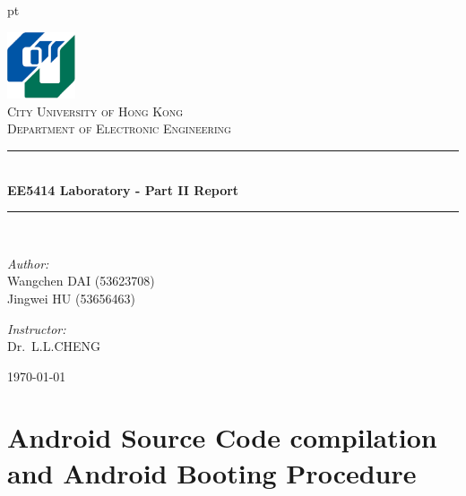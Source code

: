 \documentclass[10pt,journal,draftclsnofoot,onecolumn]{IEEEtran}
\begin{document}

 pt

\begin{titlepage}

\begin{center}


\includegraphics[width=0.15\textwidth]{./figs/logo.png}\\[1cm]    

\textsc{\LARGE City University of Hong Kong}\\[1.5cm]

\textsc{\Large Department  of Electronic Engineering}\\[0.5cm]


\rule{0.9\textwidth}{1pt}\\[0.4cm]
{ \huge \bfseries EE5414 Laboratory - Part II Report}\\[0.4cm]
\rule{0.9\textwidth}{1pt}\\[1.5cm]


\begin{minipage}[t]{0.4\textwidth}
\begin{flushleft} \large
\emph{Author:}\\
Wangchen \textsc{DAI} (53623708)\\
Jingwei \textsc{HU} (53656463)\\
\end{flushleft}
\end{minipage}
\begin{minipage}[t]{0.4\textwidth}
\begin{flushright} \large
\emph{Instructor:} \\
Dr.~L.L.\textsc{CHENG}  
\end{flushright}
\end{minipage}

\vfill

{\large \today}

\end{center}

\end{titlepage}

\clearpage

\section{Android Source Code compilation and Android Booting Procedure}\label{Intro}
\end{document}
